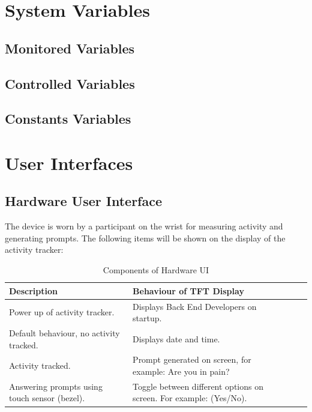 \documentclass[12pt, titlepage]{article}
\begin{document}

\section{System Variables}


\subsection{Monitored Variables}

\subsection{Controlled Variables}

\subsection{Constants Variables}

\section{User Interfaces}

\subsection{Hardware User Interface}

The device is worn by a participant on the wrist for measuring activity and generating  prompts. The following items will be shown on the display of the activity tracker:
\begin{table}[H]
	\begin{tabularx}{1.05\textwidth} { 
		  | >{\centering\arraybackslash}X 
		  | >{\centering\arraybackslash}X 
		  | >{\centering\arraybackslash}X 
		  | >{\centering\arraybackslash}X | }
		 \hline
		 \textbf{Description} & \textbf{Behaviour of TFT Display} \\
		 \hline
		Power up of activity tracker. & Displays Back End Developers on startup.\\
		\hline
		 Default behaviour, no activity tracked.  & Displays date and time.\\
		 \hline
		   Activity tracked. & Prompt generated on screen, for example: Are you in pain?\\
		\hline 
		Answering prompts using touch sensor (bezel). & Toggle between different 				options on screen. For example: (Yes/No).\\
		\hline
	\end{tabularx}
\caption{\label{Hardware User Interface}Components of Hardware UI}  
\end{table}
\end{document}

